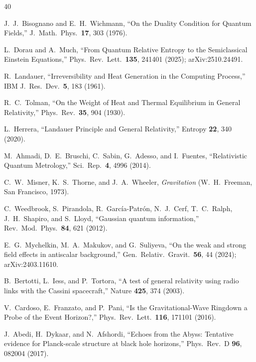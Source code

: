 \documentclass[aps,prd,preprint,superscriptaddress,longbibliography]{revtex4-2}
\begin{document}

\begin{thebibliography}{40}

J.~J.~Bisognano and E.~H.~Wichmann,
``On the Duality Condition for Quantum Fields,''
J.\ Math.\ Phys.\ \textbf{17}, 303 (1976).

L.~Dorau and A.~Much,
``From Quantum Relative Entropy to the Semiclassical Einstein Equations,''
Phys.\ Rev.\ Lett.\ \textbf{135}, 241401 (2025); arXiv:2510.24491.

R.~Landauer,
``Irreversibility and Heat Generation in the Computing Process,''
IBM J.\ Res.\ Dev.\ \textbf{5}, 183 (1961).

R.~C.~Tolman,
``On the Weight of Heat and Thermal Equilibrium in General Relativity,''
Phys.\ Rev.\ \textbf{35}, 904 (1930).

L.~Herrera,
``Landauer Principle and General Relativity,''
Entropy \textbf{22}, 340 (2020).

M.~Ahmadi, D.~E.~Bruschi, C.~Sabin, G.~Adesso, and I.~Fuentes,
``Relativistic Quantum Metrology,''
Sci.\ Rep.\ \textbf{4}, 4996 (2014).

C.~W.~Misner, K.~S.~Thorne, and J.~A.~Wheeler,
\emph{Gravitation} (W.~H.~Freeman, San Francisco, 1973).

C.~Weedbrook, S.~Pirandola, R.~Garc\'ia-Patr\'on, N.~J.~Cerf,
T.~C.~Ralph, J.~H.~Shapiro, and S.~Lloyd,
``Gaussian quantum information,''
Rev.\ Mod.\ Phys.\ \textbf{84}, 621 (2012).

E.~G.~Mychelkin, M.~A.~Makukov, and G.~Suliyeva,
``On the weak and strong field effects in antiscalar background,''
Gen.\ Relativ.\ Gravit.\ \textbf{56}, 44 (2024); arXiv:2403.11610.

B.~Bertotti, L.~Iess, and P.~Tortora,
``A test of general relativity using radio links with the Cassini
spacecraft,''
Nature \textbf{425}, 374 (2003).

V.~Cardoso, E.~Franzato, and P.~Pani,
``Is the Gravitational-Wave Ringdown a Probe of the Event Horizon?,''
Phys.\ Rev.\ Lett.\ \textbf{116}, 171101 (2016).

J.~Abedi, H.~Dykaar, and N.~Afshordi,
``Echoes from the Abyss: Tentative evidence for Planck-scale structure
at black hole horizons,''
Phys.\ Rev.\ D \textbf{96}, 082004 (2017).


\end{thebibliography}
\end{document}
